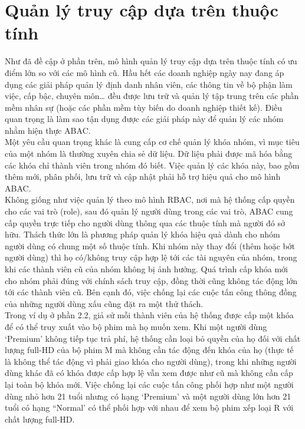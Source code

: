 \section{Quản lý truy cập dựa trên thuộc tính}
Như đã đề cập ở phần trên, mô hình quản lý truy cập dựa trên thuộc tính có ưu
điểm lớn so với các mô hình cũ. Hầu hết các doanh nghiệp ngày nay đang áp dụng các
giải pháp quản lý định danh nhân viên, các thông tin về bộ phận làm việc, cấp bậc,
chuyên môn… đều được lưu trữ và quản lý tập trung trên các phần mềm nhân sự (hoặc các phần mềm tùy biến do doanh nghiệp thiết kế). Điều quan trọng là làm sao tận dụng
được các giải pháp này để quản lý các nhóm nhằm hiện thực ABAC. \\
\indent Một yêu cầu quan trọng khác là cung cấp cơ chế quản lý khóa nhóm, vì mục tiêu
của một nhóm là thường xuyên chia sẻ dữ liệu. Dữ liệu phải được mã hóa bằng các khóa
chỉ thành viên trong nhóm đó biết. Việc quản lý các khóa này, bao gồm thêm mới, phân
phối, lưu trữ và cập nhật phải hỗ trợ hiệu quả cho mô hình ABAC.\\
\indent Không giống như việc quản lý theo mô hình RBAC, nơi mà hệ thống cấp quyền
cho các vai trò (role), sau đó quản lý người dùng trong các vai trò, ABAC cung cấp
quyền trực tiếp cho người dùng thông qua các thuộc tính mà người đó sở hữu. Thách
thức lớn là phương pháp quản lý khóa hiệu quả dành cho nhóm người dùng có chung
một số thuộc tính. Khi nhóm này thay đổi (thêm hoặc bớt người dùng) thì họ có/không
truy cập hợp lệ tới các tài nguyên của nhóm, trong khi các thành viên cũ của nhóm không
bị ảnh hưởng. Quá trình cấp khóa mới cho nhóm phải đúng với chính sách truy cập, đồng
thời cũng không tác động lớn tới các thành viên cũ. Bên cạnh đó, việc chống lại các cuộc
tấn công thông đồng của những người dùng xấu cũng đặt ra một thử thách. \\
\indent Trong ví dụ ở phần 2.2, giả sử mỗi thành viên của hệ thống được cấp một khóa
để có thể truy xuất vào bộ phim mà họ muốn xem. Khi một người dùng ‘Premium’ không
tiếp tục trả phí, hệ thống cần loại bỏ quyền của họ đối với chất lượng full-HD của bộ
phim M mà không cần tác động đến khóa của họ (thực tế là không thể tác động vì phải
giao khóa cho người dùng), trong khi những người dùng khác đã có khóa được cấp hợp
lệ vẫn xem được như cũ mà không cần cấp lại toàn bộ khóa mới. Việc chống lại các cuộc
tấn công phối hợp như một người dùng nhỏ hơn 21 tuổi nhưng có hạng ‘Premium’ và
một người dùng lớn hơn 21 tuổi có hạng “Normal’ có thể phối hợp với nhau để xem bộ
phim xếp loại R với chất lượng full-HD. \\
